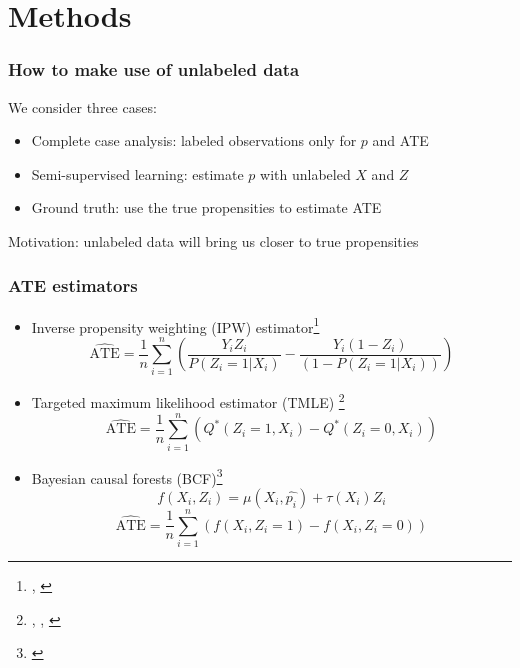 \documentclass[compress]{beamer}
\begin{document}
\section[Methods]{Methods}

\begin{frame} \frametitle{How to make use of unlabeled data}
We consider three cases:
\begin{itemize}
\item Complete case analysis: labeled observations only for $p$ and ATE
\item Semi-supervised learning: estimate $p$ with unlabeled $X$ and $Z$
\item Ground truth: use the true propensities to estimate ATE
\end{itemize}

\bigskip
\bigskip
\bigskip
\bigskip
Motivation: unlabeled data will bring us closer to true propensities
\end{frame}

\begin{frame} \frametitle{ATE estimators}
\begin{itemize}
\item Inverse propensity weighting (IPW) estimator\footnote[frame]{\cite{hirano2003efficient}, \cite{cerulli2014treatrew}}
\[\widehat{\textrm{ATE}} = \frac{1}{n} \sum_{i = 1}^{n} \left( \frac{Y_i Z_i}{P(Z_i = 1 | X_i)} - \frac{Y_i (1 - Z_i)}{(1 - P(Z_i = 1 | X_i))} \right) \]
\item Targeted maximum likelihood estimator (TMLE) \footnote[frame]{\cite{van2010targeted}, \cite{van2010targeted2}, \cite{gruber2009targeted}}
\[\widehat{\textrm{ATE}} = \frac{1}{n} \sum_{i = 1}^{n} \left( Q^*\left( Z_i = 1, X_i \right) - Q^*\left( Z_i = 0, X_i \right) \right) \] 
\item Bayesian causal forests (BCF)\footnote[frame]{\cite{hahn2017bayesian}}
\[f(X_i, Z_i) = \mu(X_i, \hat{p_i}) + \tau(X_i) Z_i \]
\[\widehat{\textrm{ATE}} = \frac{1}{n} \sum_{i = 1}^{n} \left( f(X_i, Z_i = 1) - f(X_i, Z_i = 0) \right) \]
\end{itemize}
\end{frame}
\end{document}
